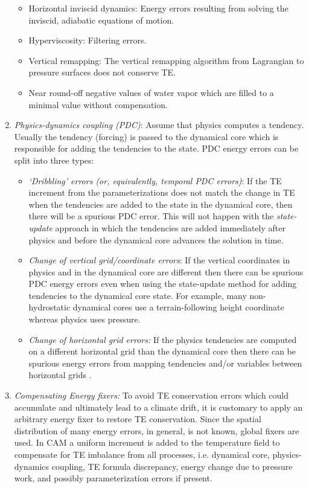 \documentclass{agujournal}
\begin{document}
\begin{enumerate}
\begin{itemize}
\item Horizontal inviscid dynamics: Energy errors resulting from solving the inviscid, adiabatic equations of motion.
\item Hyperviscosity: Filtering errors.
\item Vertical remapping: The vertical remapping algorithm from Lagrangian to pressure surfaces does not conserve TE.
\item Near round-off negative values of water vapor which are filled to a minimal value without compensation.
\end{itemize}
\item {\em{Physics-dynamics coupling (PDC)}}: Assume that physics computes a tendency. Usually the tendency (forcing) is passed to the dynamical core which is responsible for adding the tendencies to the state. PDC energy errors can be split into three types:
\begin{itemize}
\item {\em{`Dribbling' errors (or, equivalently, temporal PDC errors)}}: If the TE increment from the parameterizations does not match the change in TE when the tendencies are added to the state in the dynamical core, then there will be a spurious PDC error. This will not happen with the {\em{state-update}} approach in which the tendencies are added immediately after physics and before the dynamical core advances the solution in time.
\item {\em{Change of vertical grid/coordinate errors}}: If the vertical coordinates in physics and in the dynamical core are different then there can be spurious PDC energy errors even when using the state-update method for adding tendencies to the dynamical core state. For example, many non-hydrostatic dynamical cores \citep[e.g.][]{MPASatm} use a terrain-following height coordinate whereas physics uses pressure.
\item {\em{Change of horizontal grid errors:}} If the physics tendencies are computed on a different horizontal grid than the dynamical core then there can be spurious energy errors from mapping tendencies and/or variables between horizontal grids \citep[e.g., ][]{HetAl2018MWR}. 
\end{itemize}
\item {\em{Compensating Energy fixers:}} To avoid TE conservation errors which could accumulate and ultimately lead to a climate drift, it is customary to apply an arbitrary energy fixer to restore TE conservation. Since the spatial distribution of many energy errors, in general, is not known, global fixers are used. In CAM a uniform increment is added to the temperature field to compensate for TE imbalance from all processes, i.e. dynamical core, physics-dynamics coupling, TE formula discrepancy, energy change due to pressure work, and possibly parameterization errors if present. 
\end{enumerate}
\end{document}
